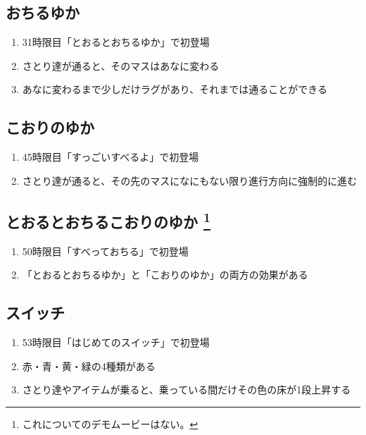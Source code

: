 \clearpage
\subsection{おちるゆか}
\begin{enumerate}[label={\sarrow}]
\item 31時限目「とおるとおちるゆか」で初登場
\item さとり達が通ると、そのマスはあなに変わる
\item あなに変わるまで少しだけラグがあり、それまでは通ることができる
\end{enumerate}


\subsection{こおりのゆか}
\begin{enumerate}[label={\sarrow}]
\item 45時限目「すっごいすべるよ」で初登場
\item さとり達が通ると、その先のマスになにもない限り進行方向に強制的に進む
\end{enumerate}


\subsection[おちるこおりのゆか]{とおるとおちるこおりのゆか%
\footnote{これについてのデモムービーはない。}%
}
\begin{enumerate}[label={\sarrow}]
\item 50時限目「すべっておちる」で初登場
\item 「とおるとおちるゆか」と「こおりのゆか」の両方の効果がある
\end{enumerate}


\subsection{スイッチ}
\begin{enumerate}[label={\sarrow}]
\item 53時限目「はじめてのスイッチ」で初登場
\item 赤・青・黄・緑の4種類がある
\item さとり達やアイテムが乗ると、乗っている間だけその色の床が1段上昇する
\end{enumerate}


